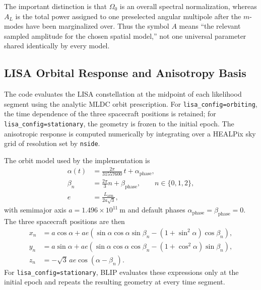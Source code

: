 \documentclass[11pt]{article}
\begin{document}
The important distinction is that $\Omega_0$ is an overall spectral normalization, whereas $A_L$ is the total power assigned to one preselected angular multipole after the $m$-modes have been marginalized over. Thus the symbol $A$ means ``the relevant sampled amplitude for the chosen spatial model,'' not one universal parameter shared identically by every model.

\subsection{LISA Orbital Response and Anisotropy Basis}
The code evaluates the LISA constellation at the midpoint of each likelihood segment using the analytic MLDC orbit prescription. For \texttt{lisa\_config=orbiting}, the time dependence of the three spacecraft positions is retained; for \texttt{lisa\_config=stationary}, the geometry is frozen to the initial epoch. The anisotropic response is computed numerically by integrating over a HEALPix sky grid of resolution set by \texttt{nside}.

The orbit model used by the implementation is
\begin{align}
\alpha(t) &= \frac{2\pi}{31557600}\,t + \alpha_{\mathrm{phase}}, \\
\beta_n &= \frac{2\pi}{3}n + \beta_{\mathrm{phase}}, \qquad n\in\{0,1,2\}, \\
e &= \frac{L_{\mathrm{arm}}}{2a\sqrt{3}},
\end{align}
with semimajor axis $a=1.496\times10^{11}\ \mathrm{m}$ and default phases $\alpha_{\mathrm{phase}}=\beta_{\mathrm{phase}}=0$. The three spacecraft positions are then
\begin{align}
x_n &= a\cos\alpha + ae\left(\sin\alpha\cos\alpha\sin\beta_n-(1+\sin^2\alpha)\cos\beta_n\right), \\
y_n &= a\sin\alpha + ae\left(\sin\alpha\cos\alpha\cos\beta_n-(1+\cos^2\alpha)\sin\beta_n\right), \\
z_n &= -\sqrt{3}\,ae\cos(\alpha-\beta_n).
\end{align}
For \texttt{lisa\_config=stationary}, BLIP evaluates these expressions only at the initial epoch and repeats the resulting geometry at every time segment.
\end{document}
